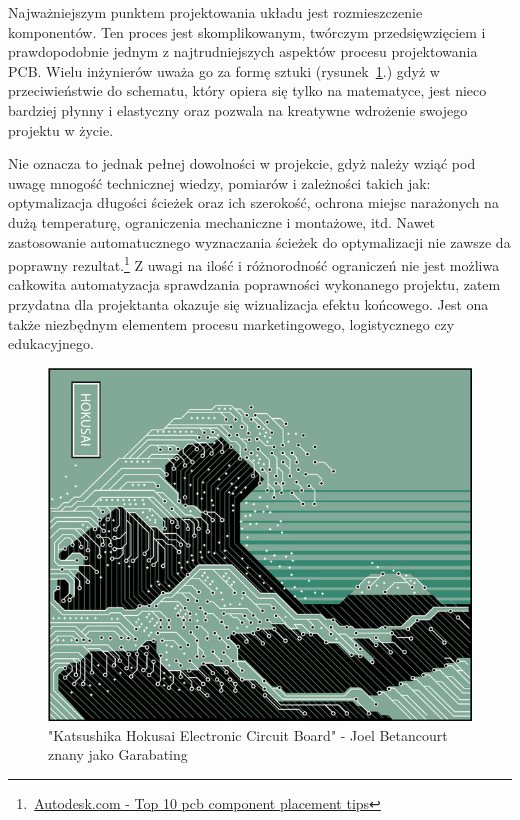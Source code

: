 \documentclass{xmgr}
\begin{document}
    Najważniejszym punktem projektowania układu jest rozmieszczenie komponentów. Ten proces jest skomplikowanym, twórczym przedsięwzięciem i prawdopodobnie jednym z najtrudniejszych aspektów procesu projektowania PCB. Wielu inżynierów uważa go za formę sztuki (rysunek~\ref{RYS.1}.) gdyż w przeciwieństwie do schematu, który opiera się tylko na matematyce, jest nieco bardziej płynny i elastyczny oraz pozwala na kreatywne wdrożenie swojego projektu w życie.

Nie oznacza to jednak pełnej dowolności w projekcie, gdyż należy wziąć pod uwagę mnogość technicznej wiedzy, pomiarów i zależności takich jak: optymalizacja długości ścieżek oraz ich szerokość, ochrona miejsc narażonych na dużą temperaturę, ograniczenia mechaniczne i montażowe, itd. Nawet zastosowanie automatucznego wyznaczania ścieżek do optymalizacji nie zawsze da poprawny rezultat.\footnote{\,\href{https://www.autodesk.com/products/eagle/blog/top-10-pcb-component-placement-tips-pcb-beginner/}{Autodesk.com - Top 10 pcb component placement tips}} Z uwagi na ilość i różnorodność ograniczeń nie jest możliwa całkowita automatyzacja sprawdzania poprawności wykonanego projektu, zatem przydatna dla projektanta okazuje się wizualizacja efektu końcowego. Jest ona także niezbędnym elementem procesu marketingowego, logistycznego czy edukacyjnego.

\begin{figure}[!tbh]
\centering
\includegraphics[width=0.82\hsize]{fig/hokusai}
\caption{"Katsushika Hokusai Electronic Circuit Board" - Joel Betancourt znany jako Garabating\label{RYS.1}}
\end{figure}
\end{document}
